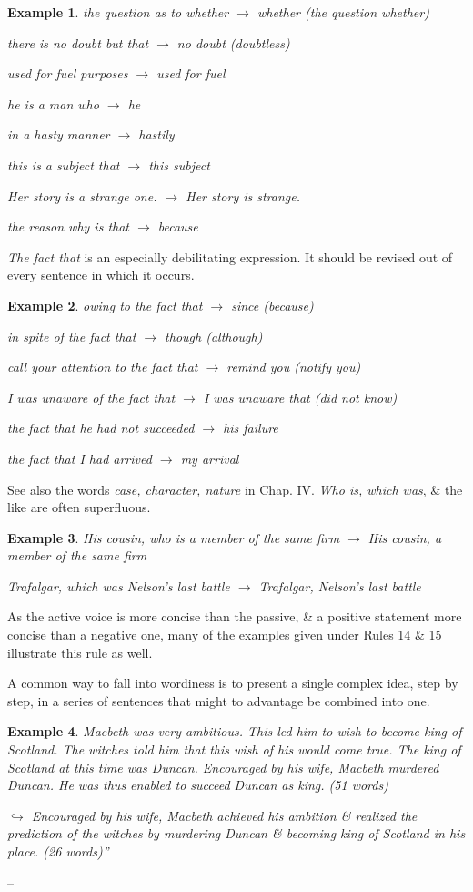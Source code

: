 \documentclass[oneside]{book}
\numberwithin{equation}{section}
\newtheorem{example}{Example}[chapter]
\begin{document}
\begin{example}
	the question as to whether $\to$ whether (the question whether)
	
	there is no doubt but that $\to$ no doubt (doubtless)
	
	used for fuel purposes $\to$ used for fuel
	
	he is a man who $\to$ he
	
	in a hasty manner $\to$ hastily
	
	this is a subject that $\to$ this subject
	
	Her story is a strange one. $\to$ Her story is strange.
	
	the reason why is that $\to$ because
\end{example}
\textit{The fact that} is an especially debilitating expression. It should be revised out of every sentence in which it occurs.

\begin{example}
	owing to the fact that $\to$ since (because)
	
	in spite of the fact that $\to$ though (although)
	
	call your attention to the fact that $\to$ remind you (notify you)
	
	I was unaware of the fact that $\to$ I was unaware that (did not know)
	
	the fact that he had not succeeded $\to$ his failure
	
	the fact that I had arrived $\to$ my arrival
\end{example}
See also the words \textit{case, character, nature} in Chap. IV. \textit{Who is, which was}, \& the like are often superfluous.

\begin{example}
	His cousin, who is a member of the same firm $\to$ His cousin, a member of the same firm
	
	Trafalgar, which was Nelson's last battle $\to$ Trafalgar, Nelson's last battle
\end{example}
As the active voice is more concise than the passive, \& a positive statement more concise than a negative one, many of the examples given under Rules 14 \& 15 illustrate this rule as well.

A common way to fall into wordiness is to present a single complex idea, step by step, in a series of sentences that might to advantage be combined into one.

\begin{example}
	Macbeth was very ambitious. This led him to wish to become king of Scotland. The witches told him that this wish of his would come true. The king of Scotland at this time was Duncan. Encouraged by his wife, Macbeth murdered Duncan. He was thus enabled to succeed Duncan as king. (51 words)
	
	$\hookrightarrow$ Encouraged by his wife, Macbeth achieved his ambition \& realized the prediction of the witches by murdering Duncan \& becoming king of Scotland in his place. (26 words)''
\end{example}
--  \cite[Chap. 2, Sect. 17, pp. 37--38]{Strunk_White2019}
\end{document}
